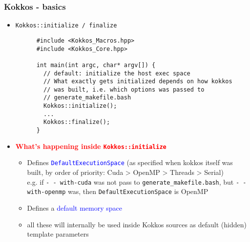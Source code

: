 \begin{frame}[fragile=singleslide]
  \frametitle{Kokkos - basics}

  \begin{itemize}
  \item \texttt{Kokkos::initialize / finalize}
    \begin{verbatim}
      #include <Kokkos_Macros.hpp>
      #include <Kokkos_Core.hpp>
      
      int main(int argc, char* argv[]) {
        // default: initialize the host exec space
        // What exactly gets initialized depends on how kokkos
        // was built, i.e. which options was passed to
        // generate_makefile.bash
        Kokkos::initialize();
        ...
        Kokkos::finalize();
      }
    \end{verbatim}
  \item \textcolor{red}{\textbf{What's happening inside \texttt{Kokkos::initialize}}}
    \begin{itemize}
    \item Defines \textcolor{blue}{\texttt{DefaultExecutionSpace}} (as specified when kokkos itself was built, by order of priority: Cuda > OpenMP > Threads > Serial)\\
      e.g. if \texttt{\-- \-- with-cuda} was not pass to \texttt{generate\_makefile.bash}, but \texttt{\-- \-- with-openmp} was, then \texttt{DefaultExecutionSpace} is OpenMP
    \item Defines a \textcolor{blue}{default memory space}
    \item all these will internally be used inside Kokkos sources as default (hidden) template parameters
    \end{itemize}
  \end{itemize}
\end{frame}

